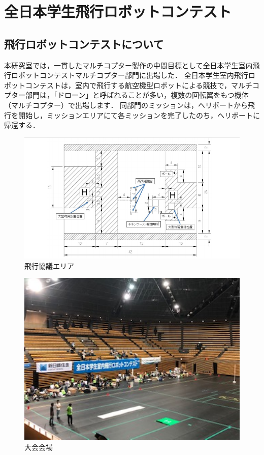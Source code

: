 
\chapter{全日本学生飛行ロボットコンテスト}
\section{飛行ロボットコンテストについて}
本研究室では，一貫したマルチコプター製作の中間目標として全日本学生室内飛行ロボットコンテストマルチコプター部門に出場した．
全日本学生室内飛行ロボットコンテストは，室内で飛行する航空機型ロボットによる競技で，マルチコプター部門は，「ドローン」と呼ばれることが多い，複数の回転翼をもつ機体（マルチコプター）で出場します．
同部門のミッションは，ヘリポートから飛行を開始し，ミッションエリアにて各ミッションを完了したのち，ヘリポートに帰還する．


\begin{figure}[htbp]
  \begin{center}
    \includegraphics[width=150mm]{img/１７.png}
    \end{center}
  \caption{飛行協議エリア}
 \label{fig:robot}

\end{figure}\begin{figure}[htbp]
  \begin{center}
    \includegraphics[width=120mm]{img/２０.JPG}
    \end{center}
  \caption{大会会場}
 \label{fig:robot}
\end{figure}

